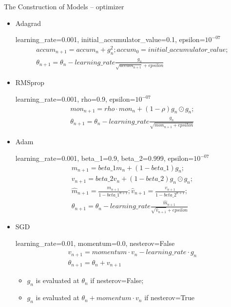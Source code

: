 \documentclass{beamer}
\begin{document}
\begin{frame}{The Construction of Models -- optimizer}


\begin{itemize}
  \item Adagrad

  learning\_rate=0.001, initial\_accumulator\_value=0.1, epsilon=$10^{-07}$
  \begin{gather*}
    accum_{n+1}=accum_{n}+g_n^2; accum_0=initial\_accumulator\_value; \\
    \theta_{n+1}=\theta_n-learning\_rate\frac{g_n}{\sqrt{accum_{n+1}}+epsilon}
  \end{gather*}
  \item RMSprop

  learning\_rate=0.001, rho=0.9, epsilon=$10^{-07}$
  \begin{gather*}
    mon_{n+1}=rho\cdot mon_n+(1-\rho) g_n\odot g_n;\\
    \theta_{n+1}=\theta_n-learning\_rate\frac{g_n}{\sqrt{mon_{n+1}+epsilon}}
  \end{gather*}
\end{itemize}
\end{frame}


\begin{frame}
\begin{itemize}
  \item Adam

  learning\_rate=0.001, beta\_1=0.9, beta\_2=0.999, epsilon=$10^{-07}$
  \begin{gather*}
    m_{n+1}=beta\_1m_n+(1-beta\_1)g_n;\\
    v_{n+1}=beta\_2v_n+(1-beta\_2)g_n\odot g_n;\\
    \hat{m}_{n+1}=\frac{m_{n+1}}{1-beta\_1^{n+1}}; \hat{v}_{n+1}=\frac{v_{n+1}}{1-beta\_2^{n+1}};\\
    \theta_{n+1}=\theta_n-learning\_rate\frac{\hat{m}_{n+1}}{\sqrt{\hat{v}_{n+1}}+epsilon}
  \end{gather*}
  \item SGD

  learning\_rate=0.01, momentum=0.0, nesterov=False
  \begin{gather*}
    v_{n+1}=momentum\cdot v_n-learning\_rate\cdot g_n \\
    \theta_{n+1}=\theta_n+v_{n+1}
  \end{gather*}
  \begin{itemize}
    \item $g_n$ is evaluated at $\theta_n$ if nesterov=False;
    \item $g_n$ is evaluated at $\theta_n+ momentum\cdot v_n$ if nesterov=True
  \end{itemize}
\end{itemize}
\end{frame}
\end{document}
